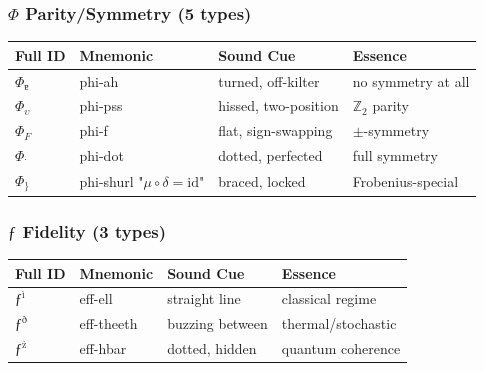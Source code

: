 \documentclass[12pt,a4paper]{article}
\begin{document}
\subsubsection{$\Phi$ Parity/Symmetry (5 types)}

\begin{table}[htbp]
\centering
\small
{}
\begin{tabularx}{\textwidth}{>{\centering\arraybackslash}X >{\centering\arraybackslash}X >{\centering\arraybackslash}X >{\centering\arraybackslash}X}
\toprule
\rowcolor{gray!25}\textbf{Full ID} & \textbf{Mnemonic} & \textbf{Sound Cue} & \textbf{Essence} \\
\midrule
\rowcolors{1}{white}{gray!10}
$\Phi_{\text{ɐ}}$ & phi-ah & turned, off-kilter & no symmetry at all \\
$\Phi_{\upsilon}$ & phi-pss & hissed, two-position & $\mathbb{Z}_2$ parity \\
$\Phi_{F}$ & phi-f & flat, sign-swapping & $\pm$-symmetry \\
$\Phi_{\text{˙}}$ & phi-dot & dotted, perfected & full symmetry \\
$\Phi_{\}}$ & phi-shurl "$\mu \circ \delta = \text{id}$" & braced, locked & Frobenius-special \\
\bottomrule
\end{tabularx}
\end{table}

\subsubsection{$ƒ$ Fidelity (3 types)}

\begin{table}[htbp]
\centering
\small
{}
\begin{tabularx}{\textwidth}{>{\centering\arraybackslash}X >{\centering\arraybackslash}X >{\centering\arraybackslash}X >{\centering\arraybackslash}X}
\toprule
\rowcolor{gray!25}\textbf{Full ID} & \textbf{Mnemonic} & \textbf{Sound Cue} & \textbf{Essence} \\
\midrule
\rowcolors{1}{white}{gray!10}
$ƒ^{\text{ì}}$ & eff-ell & straight line & classical regime \\
$ƒ^{\text{ð}}$ & eff-theeth & buzzing between & thermal/stochastic \\
$ƒ^{\text{ż}}$ & eff-hbar & dotted, hidden & quantum coherence \\
\bottomrule
\end{tabularx}
\end{table}
\end{document}
